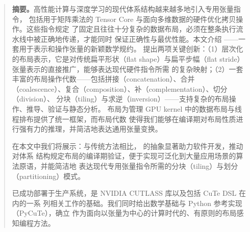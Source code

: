 \begin{quotation}\noindent\small
\textbf{摘要。}高性能计算与深度学习的现代体系结构越来越多地引入专用张量指令，
包括用于矩阵乘法的 Tensor Core 与面向多维数据的硬件优化拷贝操作。这些指令规定
了固定且往往十分复杂的数据布局，必须在整条执行流水线中被正确地传递，才能同时
保证正确性与最优性能。本文介绍 \CuTe{}——一套用于表示和操作张量的新颖数学规约。
\CuTe{} 提出两项关键创新：（1）层次化的布局表示，它是对传统扁平形状（flat
shape）与扁平步幅（flat stride）张量表示的直接推广，能够表达现代硬件指令所需
的复杂映射；（2）一套丰富的布局操作代数——包括拼接（concatenation）、合并
（coalescence）、复合（composition）、补（complementation）、切分（division）、
分块（tiling）与求逆（inversion）——支持复杂的布局操作、推导、验证与静态分析。
\CuTe{} 布局为管理 GPU kernel 中的数据布局与线程排布提供了统一框架，而布局代数
使得我们能够在编译期对布局性质进行强有力的推理，并简洁地表达通用张量变换。

在本文中我们将展示：与传统方法相比，\CuTe{} 的抽象显著助力软件开发，推动对体系
结构规定布局的编译期验证，便于实现可泛化到大量应用场景的算法原语，并能简洁地
表达现代专用张量指令所需的分块（tiling）与划分（partitioning）模式。

\CuTe{} 已成功部署于生产系统，是 NVIDIA CUTLASS 库以及包括 CuTe DSL 在内的一系
列相关工作的基础。我们同时给出数学基础与 Python 参考实现（PyCuTe），确立 \CuTe{}
作为面向以张量为中心的计算时代的、有原则的布局感知编程方法。
\end{quotation}










\endgroup
